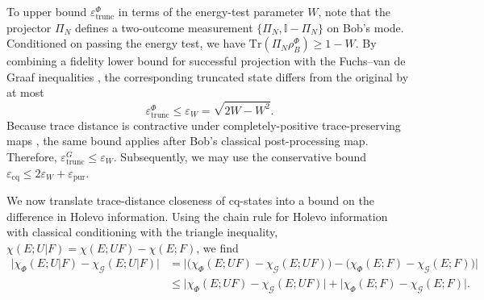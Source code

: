 ﻿\documentclass[12pt]{article}
\begin{document}
To upper bound $\varepsilon_{\mathrm{trunc}}^{\Phi}$ in terms of the energy-test parameter $W$, note that the projector $\Pi_N$ defines a two-outcome measurement $\{\Pi_N,\mathbb{I}-\Pi_N\}$ on Bob's mode. Conditioned on passing the energy test, we have $\mathrm{Tr}(\Pi_N\rho_B^\Phi)\ge 1-W$. By combining a fidelity lower bound for successful projection with the Fuchs--van de Graaf inequalities \cite{Watrous-2018}, the corresponding truncated state differs from the original by at most
\begin{equation}
\varepsilon_{\mathrm{trunc}}^{\Phi}\le \varepsilon_W = \sqrt{2W-W^2}.
\end{equation}
Because trace distance is contractive under completely-positive trace-preserving maps \cite{Watrous-2018}, the same bound applies after Bob's classical post-processing map. Therefore, $\varepsilon_{\mathrm{trunc}}^{G}\le \varepsilon_W$. Subsequently, we may use the conservative bound $\varepsilon_{\mathrm{cq}}\le 2\varepsilon_W+\varepsilon_{\mathrm{pur}}$.

We now translate trace-distance closeness of cq-states into a bound on the difference in Holevo information. Using the chain rule for Holevo information with classical conditioning with the triangle inequality, $\chi(E;U|F)=\chi(E;UF)-\chi(E;F)$, we find
\begin{align}
  \label{eq: triangle inequality for holevo}
\big|\chi_\Phi(E;U|F)-\chi_\mathcal{G}(E;U|F)\big|
&=\big|\big(\chi_\Phi(E;UF)-\chi_\mathcal{G}(E;UF)\big)-\big(\chi_\Phi(E;F)-\chi_\mathcal{G}(E;F)\big)\big| \nonumber\\
&\le \big|\chi_\Phi(E;UF)-\chi_\mathcal{G}(E;UF)\big|+\big|\chi_\Phi(E;F)-\chi_\mathcal{G}(E;F)\big|.
\end{align}
\end{document}
